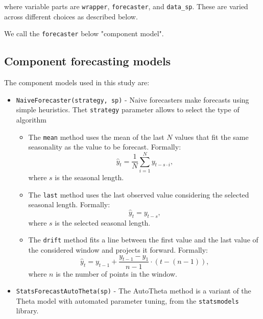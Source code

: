 where variable parts are \texttt{wrapper}, \texttt{forecaster}, and \texttt{data\_sp}. These are varied across different choices as described below.

We call the \texttt{forecaster} below "component model".

\subsection{Component forecasting models}

The component models used in this study are:

\begin{itemize}
    
    \item \texttt{NaiveForecaster(strategy, sp)} - Naive forecasters make forecasts using simple heuristics. Thet \texttt{strategy} parameter allows to select the type of algorithm
    \begin{itemize}
        \item The \texttt{mean} method uses the mean of the last \(N\) values that fit the same seasonality as the value to be forecast. Formally:
        \begin{equation}
            \hat{y}_t = \frac{1}{N} \sum_{i=1}^N y_{t-s \cdot i},
        \end{equation}
        where \(s\) is the seasonal length.
        \item The \texttt{last} method uses the last observed value considering the selected seasonal length. Formally:
        \begin{equation}
            \hat{y}_t = y_{t-s},
        \end{equation}
        where \(s\) is the selected seasonal length.
        \item The \texttt{drift} method fits a line between the first value and the last value of the considered window and projects it forward. Formally:
        \begin{equation}
            \hat{y}_t = y_{t-1} + \frac{y_{t-1} - y_1}{n-1} \cdot (t - (n-1)),
        \end{equation}
        where \(n\) is the number of points in the window.
    \end{itemize}

    \item \texttt{StatsForecastAutoTheta(sp)} - The AutoTheta method is a variant of the Theta model \cite{Assimakopoulos2000} with automated parameter tuning, from the \texttt{statsmodels} library.
    
\end{itemize}


